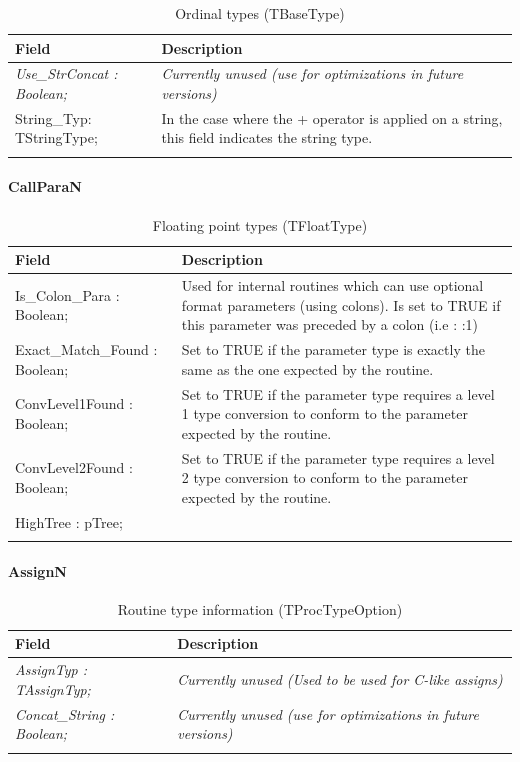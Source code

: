 \documentclass [a4paper,12pt]{article}
\begin{document}
\begin{longtable}{|l|p{10cm}|}
\hline
Field	& Description \\
\hline
\endhead
\hline
\endfoot
\textsf{\textit{Use{\_}StrConcat : Boolean;}}&
	\textit{Currently unused (use for optimizations in future versions)} \\
\hline
\textsf{String{\_}Typ: TStringType;}&
	In the case where the + operator is applied on a string, this field indicates the string type. \\
\hline
\caption{Ordinal types (TBaseType)}
\label{tab9}
\end{longtable}

\paragraph{CallParaN}\mbox{}

\begin{longtable}{|l|p{10cm}|}
\hline
Field	& Description \\
\hline
\endhead
\hline
\endfoot
\textsf{Is{\_}Colon{\_}Para : Boolean;}&
	Used for internal routines which can use optional format parameters
	(using colons). Is set to TRUE if this parameter was preceded by a
	colon (i.e : :1) \\
\textsf{Exact{\_}Match{\_}Found : Boolean;}&
	Set to TRUE if the parameter type is exactly the same as the one
	expected by the routine. \\
\textsf{ConvLevel1Found : Boolean;}&
	Set to TRUE if the parameter type requires a level 1 type conversion
	to conform to the parameter expected by the routine. \\
\textsf{ConvLevel2Found : Boolean;}&
	Set to TRUE if the parameter type requires a level 2 type conversion
	to conform to the parameter expected by the routine. \\
\textsf{HighTree : pTree;}&  \\
\hline
\caption{Floating point types (TFloatType)}
\label{tab10}
\end{longtable}

\paragraph{AssignN}\mbox{}

\begin{longtable}{|l|p{10cm}|}
\hline
Field	& Description \\
\hline
\endhead
\hline
\endfoot
\textsf{\textit{AssignTyp : TAssignTyp;}}&
	\textit{Currently unused (Used to be used for C-like assigns)} \\
\textsf{\textit{Concat{\_}String : Boolean;}}&
	\textit{Currently unused (use for optimizations in future versions)}\\
\hline
\caption{Routine type information (TProcTypeOption)}
\end{longtable}
\end{document}
